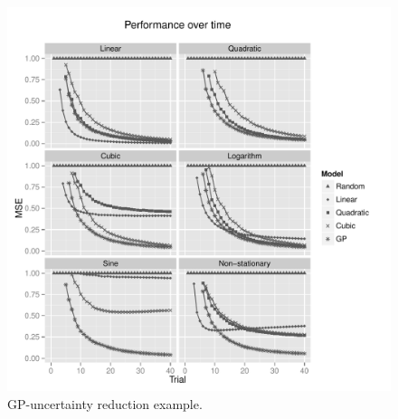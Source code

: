 \documentclass[authoryear,11pt,review]{elsarticle}
\begin{document}
\FloatBarrier
\begin{figure}[ht]
 \caption{GP-uncertainty reduction example.}
\label{perfomance}
  \centering
    \includegraphics[scale=0.95]{figs/activeperfomance.pdf}
\end{figure}
\FloatBarrier

\end{document}
